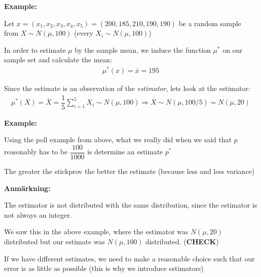 \noindent\textbf{Example:}\par
\noindent Let $x = (x_1,x_2,x_3,x_4,x_5) = (200,185,210,190,190)$ be a random sample from $X\sim N(\mu, 100)$ (every $X_i\sim N(\mu,100)$)
\par\bigskip
\noindent In order to estimate $\mu$ by the sample mean, we induce the function $\mu^*$ on our sample set and calculate the mean:
\begin{equation*}
  \begin{gathered}
    \mu^*(x) = \overline{x} = 195
  \end{gathered}
\end{equation*}\par
\noindent Since the estimate is an observation of the \textit{estimator}, lets look at the estimator:
\begin{equation*}
  \begin{gathered}
    \mu^*(X) = \overline{X} = \dfrac{1}{5}\sum_{i=1}^{5}X_i\sim N(\mu,100) \Rightarrow\overline{X}\sim N(\mu,100/5) = N(\mu, 20)
  \end{gathered}
\end{equation*}
\par\bigskip
\noindent\textbf{Example:}\par
\noindent Using the poll example from above, what we really did when we said that $p$ reasonably has to be $\dfrac{100}{1000}$ is determine an estimate $p^*$
\par\bigskip
\noindent The greater the stickprov the better the estimate (because less and less variance)
\par\bigskip
\noindent\textbf{Anmärkning:}\par
\noindent The estimator is not distributed with the same distribution, since the estimator is not always an integer.\par
\noindent We saw this in the above example, where the estimator was $N(\mu, 20)$ distributed but our estimate was $N(\mu,100)$  distributed. (\textbf{CHECK})
\par\bigskip
\noindent If we have different estimates, we need to make a reasonable choice such that our error is as little as possible (this is why we introduce estimators)
\par\bigskip
